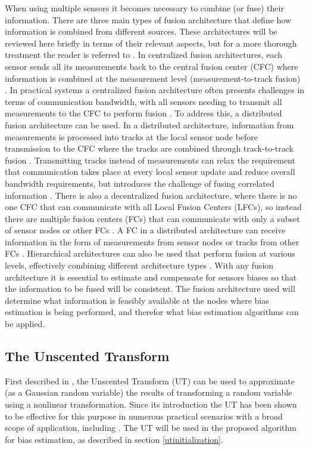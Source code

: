 \documentclass[journal]{IEEEtran}
\begin{document}
When using multiple sensors it becomes necessary to combine (or fuse) their information. There are three main types of fusion architecture that define how information is combined from different sources. These architectures will be reviewed here briefly in terms of their relevant aspects, but for a more thorough treatment the reader is referred to \cite{castanedo2013review}. In centralized fusion architectures, each sensor sends all its measurements back to the central fusion center (CFC) where information is combined at the measurement level (measurement-to-track fusion) \cite{castanedo2013review}. In practical systems a centralized fusion architecture often presents challenges in terms of communication bandwidth, with all sensors needing to transmit all measurements to the CFC to perform fusion \cite{castanedo2013review}. To address this, a distributed fusion architecture can be used. In a distributed architecture, information from measurements is processed into tracks at the local sensor node before transmission to the CFC where the tracks are combined through track-to-track fusion \cite{castanedo2013review}. Transmitting tracks instead of measurements can relax the requirement that communication takes place at every local sensor update and reduce overall bandwidth requirements, but introduces the challenge of fusing correlated information \cite{castanedo2013review}. There is also a decentralized fusion architecture, where there is no one CFC that can communicate with all Local Fusion Centers (LFCs), so instead there are multiple fusion centers (FCs) that can communicate with only a subset of sensor nodes or other FCs \cite{castanedo2013review}. A FC in a distributed architecture can receive information in the form of measurements from sensor nodes or tracks from other FCs \cite{castanedo2013review}. Hierarchical architectures can also be used that perform fusion at various levels, effectively combining different architecture types \cite{castanedo2013review}. With any fusion architecture it is essential to estimate and compensate for sensors biases so that the information to be fused will be consistent. The fusion architecture used will determine what information is feasibly available at the nodes where bias estimation is being performed, and therefor what bias estimation algorithms can be applied.

\subsection{The Unscented Transform} \label{unscentedtransform}
First described in \cite{julier1997new}, the Unscented Transform (UT) can be used to approximate (as a Gaussian random variable) the results of transforming a random variable using a nonlinear transformation. Since its introduction the UT has been shown to be effective for this purpose in numerous practical scenarios with a broad scope of application, including \cite{kim2009terrain, luo2009ensemble, zou2021stochastic}. The UT will be used in the proposed algorithm for bias estimation, as described in section \ref{utinitialization}.
\end{document}
